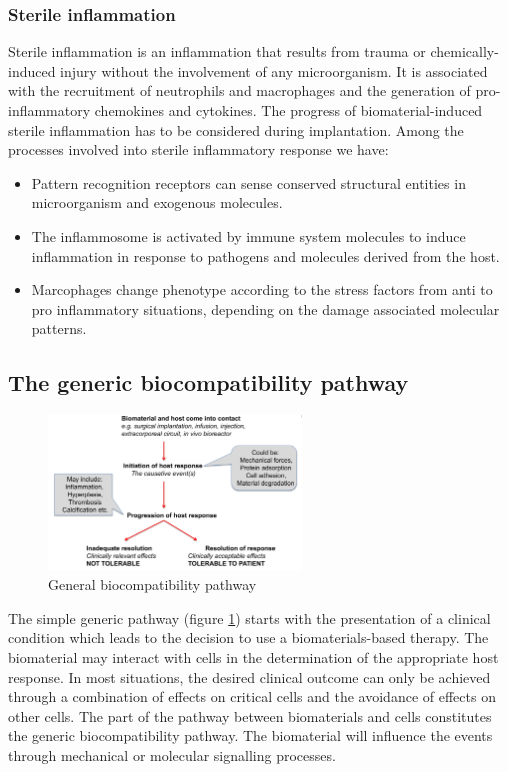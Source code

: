 		\subsubsection{Sterile inflammation}
		Sterile inflammation is an inflammation that results from trauma or chemically-induced injury without the involvement of any microorganism.
		It is associated with the recruitment of neutrophils and macrophages and the generation of pro-inflammatory chemokines and cytokines.
		The progress of biomaterial-induced sterile inflammation has to be considered during implantation.
		Among the processes involved into sterile inflammatory response we have:

		\begin{multicols}{2}
			\begin{itemize}
				\item Pattern recognition receptors can sense conserved structural entities in microorganism and exogenous molecules.
				\item The inflammosome is activated by immune system molecules to induce inflammation in response to pathogens and molecules derived from the host.
				\item Marcophages change phenotype according to the stress factors from anti to pro inflammatory situations, depending on the damage associated molecular patterns.
			\end{itemize}
		\end{multicols}

	\subsection{The generic biocompatibility pathway}

	\begin{figure}[ht]
		\includegraphics[width=0.6\textwidth]{biocomp_pathway.png}
		\caption{General biocompatibility pathway}
		\label{fig:biocomp_path}
	\end{figure}

	The simple generic pathway (figure \ref{fig:biocomp_path}) starts with the presentation of a clinical condition which leads to the decision to use a biomaterials-based therapy.
	The biomaterial may interact with cells in the determination of the appropriate host response.
	In most situations, the desired clinical outcome can only be achieved through a combination of effects on critical cells and the avoidance of effects on other cells.
	The part of the pathway between biomaterials and cells constitutes the generic biocompatibility pathway.
	The biomaterial will influence the events through mechanical or molecular signalling processes.

